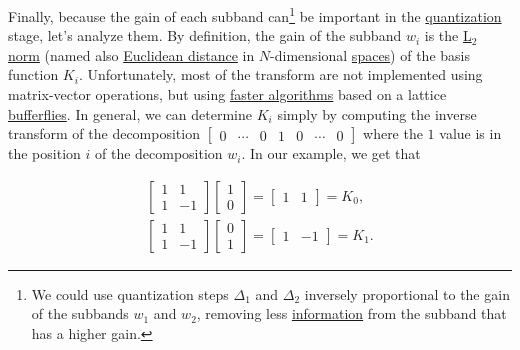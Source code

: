Finally, because the gain of each subband can\footnote{We could use
quantization steps $\Delta_1$ and $\Delta_2$ inversely proportional to
the gain of the subbands $w_1$ and $w_2$, removing less
\href{https://en.wikipedia.org/wiki/Information}{information} from the
subband that has a higher gain.} be important in the
\href{https://en.wikipedia.org/wiki/Quantization_(signal_processing)}{quantization}
stage, let's analyze them. By definition, the gain of the subband
$w_i$ is the \href{https://en.wikipedia.org/wiki/Lp_space}{L$_2$ norm}
(named also
\href{https://en.wikipedia.org/wiki/Euclidean_distance}{Euclidean
  distance} in $N$-dimensional
\href{https://en.wikipedia.org/wiki/Vector_space}{spaces}) of the
basis function $K_i$. Unfortunately, most of the transform are not
implemented using matrix-vector operations, but using
\href{https://en.wikipedia.org/wiki/Fast_Fourier_transform}{faster
  algorithms} based on a lattice
\href{https://en.wikipedia.org/wiki/Butterfly_diagram}{bufferflies}. In
general, we can determine $K_i$ simply by computing the inverse
transform of the decomposition $\begin{bmatrix} 0 & \cdots & 0 & 1 & 0
  & \cdots & 0 \end{bmatrix}$ where the $1$ value is in the position
$i$ of the decomposition $w_i$. In our example, we get that

\begin{equation}
  \begin{array}{l}
    \begin{bmatrix}
      1 & 1 \\
      1 & -1
    \end{bmatrix}
    \begin{bmatrix}
      1 \\
      0
    \end{bmatrix}
    =
    \begin{bmatrix}
      1 & 1
    \end{bmatrix} = K_0,
    \\
    \begin{bmatrix}
      1 & 1 \\
      1 & -1
    \end{bmatrix}
    \begin{bmatrix}
      0 \\
      1
    \end{bmatrix}
    =
    \begin{bmatrix}
      1 & -1
    \end{bmatrix} = K_1.
  \end{array}
\end{equation}

